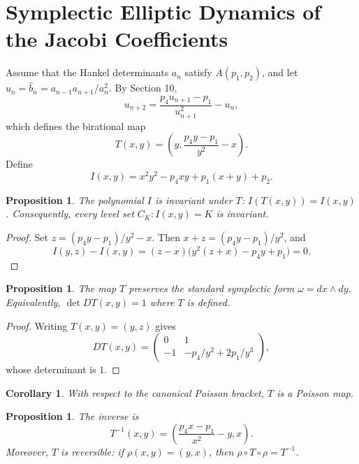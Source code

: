 \documentclass[11pt]{article}
\newtheorem{proposition}[theorem]{Proposition}
\newtheorem{corollary}[theorem]{Corollary}
\theoremstyle{remark}
\begin{document}
\section{Symplectic Elliptic Dynamics of the Jacobi Coefficients}
Assume that the Hankel determinants $a_n$ satisfy $A(p_1,p_2)$, and let $u_n=\widehat b_n=a_{n-1}a_{n+1}/a_n^2$. By Section 10,
\begin{equation}
u_{n+2}=\frac{p_4u_{n+1}-p_1}{u_{n+1}^2}-u_n,
\end{equation}
which defines the birational map
\begin{equation}
T(x,y)=\left(y,\frac{p_4y-p_1}{y^2}-x\right).
\end{equation}
Define
\begin{equation}
I(x,y)=x^2y^2-p_4xy+p_1(x+y)+p_2.
\end{equation}
\begin{proposition}
The polynomial $I$ is invariant under $T$: $I(T(x,y))=I(x,y)$. Consequently, every level set $C_K:I(x,y)=K$ is invariant.
\end{proposition}
\begin{proof}
Set $z=(p_4y-p_1)/y^2-x$. Then $x+z=(p_4y-p_1)/y^2$, and
\[
I(y,z)-I(x,y)=(z-x)\bigl(y^2(z+x)-p_4y+p_1\bigr)=0.
\]
\end{proof}
\begin{proposition}
The map $T$ preserves the standard symplectic form $\omega=dx\wedge dy$. Equivalently, $\det DT(x,y)=1$ where $T$ is defined.
\end{proposition}
\begin{proof}
Writing $T(x,y)=(y,z)$ gives
\[
DT(x,y)=\begin{pmatrix}0&1\\-1&-p_4/y^2+2p_1/y^3\end{pmatrix},
\]
whose determinant is $1$.
\end{proof}
\begin{corollary}
With respect to the canonical Poisson bracket, $T$ is a Poisson map.
\end{corollary}
\begin{proposition}
The inverse is
\begin{equation}
T^{-1}(x,y)=\left(\frac{p_4x-p_1}{x^2}-y,x\right).
\end{equation}
Moreover, $T$ is reversible: if $\rho(x,y)=(y,x)$, then $\rho\circ T\circ\rho=T^{-1}$.
\end{proposition}
\end{document}
